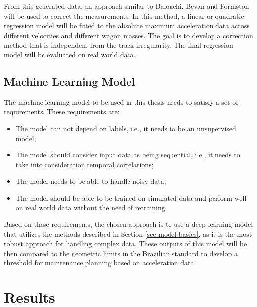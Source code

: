 From this generated data, an approach similar to Balouchi, Bevan and Formston \cite{Balouchi02092021} will be used to correct the measurements. In this method, a linear or quadratic regression model will be fitted to the absolute maximum acceleration data across different velocities and different wagon masses. The goal is to develop a correction method that is independent from the track irregularity. The final regression model will be evaluated on real world data.

\section{Machine Learning Model} \label{sec-ml-model}

The machine learning model to be used in this thesis needs to satisfy a set of requirements. These requirements are:
\begin{itemize}
    \item The model can not depend on labels, i.e., it needs to be an unsupervised model;
    \item The model should consider input data as being sequential, i.e., it needs to take into consideration temporal correlations;
    \item The model needs to be able to handle noisy data;
    \item The model should be able to be trained on simulated data and perform well on real world data without the need of retraining.
\end{itemize}

Based on these requirements, the chosen approach is to use a deep learning model that utilizes the methods described in Section \ref{sec-model-basics}, as it is the most robust approach for handling complex data. These outputs of this model will be then compared to the geometric limits in the Brazilian standard to develop a threshold for maintenance planning based on acceleration data.

\chapter{Results} \label{sec-Results}
